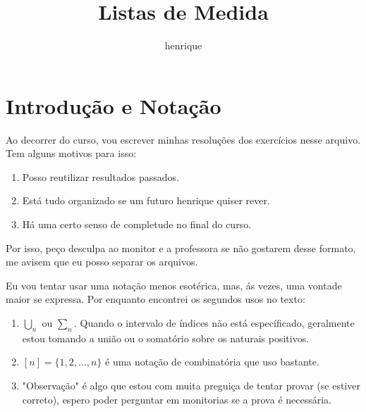 \documentclass{article}
\author{henrique}
\title{Listas de Medida}
\theoremstyle{definition}
\begin{document}
\maketitle

\tableofcontents
\setcounter{section}{-1}

\section{Introdução e Notação}
Ao decorrer do curso, vou escrever minhas resoluções dos exercícios nesse arquivo. Tem alguns motivos para isso:
\begin{enumerate}
	\item Posso reutilizar resultados passados.
	\item Está tudo organizado se um futuro henrique quiser rever.
	\item Há uma certo senso de completude no final do curso.
\end{enumerate}
Por isso, peço desculpa ao monitor e a professora se não gostarem desse formato, me avisem que eu posso separar os arquivos.

Eu vou tentar usar uma notação menos esotérica, mas, ás vezes, uma vontade maior se expressa. Por enquanto encontrei os segundos usos no texto:
\begin{enumerate}
	\item $\bigcup_n$ ou $\sum_n$. Quando o intervalo de índices não está específicado, geralmente estou tomando a união ou o somatório
	sobre os naturais positivos.
	\item $[n] = \{1,2,\dots, n\}$ é uma notação de combinatória que uso bastante.
	\item "Observação" é algo que estou com muita preguiça de tentar provar (se estiver correto), 
	espero poder perguntar em monitorias se a prova é necessária.
\end{enumerate}




\end{document}
